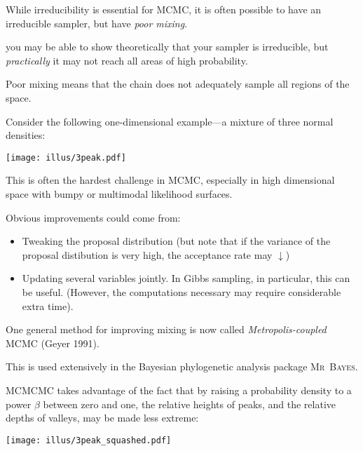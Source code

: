 While irreducibility is essential for MCMC, it is often possible to have an irreducible sampler, but have {\em poor mixing}.

\ie{} you may be able to show theoretically that your sampler is irreducible, but {\em practically} it may not reach all areas of high probability.

Poor mixing means that the chain does not adequately sample all regions of the space.  

Consider the following one-dimensional example---a mixture of  three normal densities:

\newpage
\begin{center}
\texttt{[image: illus/3peak.pdf]}
\end{center}
\enlargethispage*{1000pt}

This is often the hardest challenge in MCMC, especially in high dimensional  space with bumpy or multimodal likelihood surfaces.  

Obvious improvements could come from:
\begin{itemize}
\item Tweaking the proposal distribution (but note that if the variance of the proposal distibution is very high, the acceptance rate may $\downarrow$)
\item Updating several variables jointly. In Gibbs sampling, in particular, this can be useful.  (However, the computations necessary may require considerable extra time).
\end{itemize}

One general method for improving mixing is now called {\em Metropolis-coupled} MCMC (Geyer 1991).  

This is used extensively in the Bayesian phylogenetic analysis package \textsc{Mr~Bayes}.

MCMCMC takes advantage of the fact that by raising a probability density to a power $\beta$ between zero and one, the relative heights of peaks, and the relative depths of valleys, may be made less extreme:

\enlargethispage*{100pt}
\vspace*{-.09in}
\begin{center}
\texttt{[image: illus/3peak\_squashed.pdf]}
\end{center}

